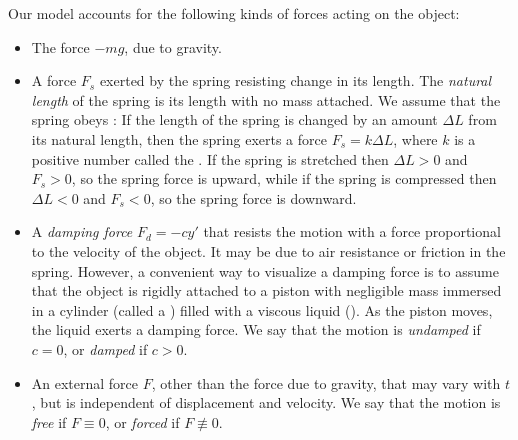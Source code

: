 Our model accounts for the following kinds of forces acting on the
object:

\begin{itemize}
\item The force $-mg$, due to gravity.

\item A force $F_s$ exerted by the spring resisting change in its
length. The
\emph{\color{blue}natural length}
of the spring is its length with
no mass attached. We assume that the spring obeys
:
If the length of the spring is changed by an amount $\Delta L$
from its natural length,  then the spring exerts a force $F_s=k\Delta
L$, where $k$ is a positive number called the .
If the spring is stretched then  $\Delta L>0$ and $F_s>0$, so the
spring force is upward, while if the spring is compressed then $\Delta
L<0$ and $F_s<0$, so the spring force is downward.

\item A
\emph{\color{blue}damping force}
$F_d=-cy'$ that resists the motion with
a force proportional to the velocity of the object. It may be due to
air resistance or friction in the spring. However, a convenient way to
visualize a damping force is to assume that the object is rigidly
attached to a piston with negligible mass immersed in a cylinder
(called a ) filled with a viscous liquid
(). As the piston moves, the liquid exerts a
damping force. We say that the motion is
\emph{\color{blue}undamped}
if $c=0$, or
\emph{\color{blue}damped}
if $c>0$.


\item An external force $F$, other than the force due to gravity, that
may vary with $t$, but is independent of displacement and velocity. We
say that the motion is \emph{\color{blue}free} if $F\equiv0$, or \emph{\color{blue}forced}
if $F\not\equiv0$.

\end{itemize}



